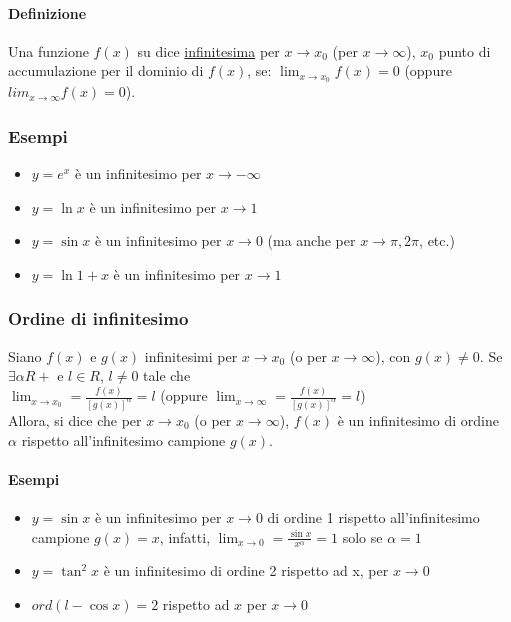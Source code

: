 \documentclass{book}
\begin{document}
\paragraph{Definizione}
Una funzione $f(x)$ su dice \underline{infinitesima} per $x\to x_0$ (per $x\to \infty$), $x_0$ punto di accumulazione per il dominio di $f(x)$, se: $\lim_{x\to x_0}f(x)=0$ (oppure $lim_{x\to \infty}f(x)=0$).
\subsubsection{Esempi}
\begin{itemize}
	\item $y=e^x$ è un infinitesimo per $x\to -\infty$
	\item $y=\ln{x}$ è un infinitesimo per $x\to 1$
	\item $y=\sin{x}$ è un infinitesimo per $x\to 0$ (ma anche per $x\to \pi,2\pi$, etc.)
	\item $y=\ln{1+x}$ è un infinitesimo per $x\to 1$ 
\end{itemize}
\subsubsection{Ordine di infinitesimo}
Siano $f(x)$ e $g(x)$ infinitesimi per $x\to{x_0}$ (o per $x\to \infty$), con $g(x)\neq 0$. Se $\exists\alpha R+$ e $l\in R$, $l\neq 0$ tale che\\
$\lim_{x\to{x_0}}=\frac{f(x)}{[g(x)]^\alpha}=l$ (oppure $\lim_{x\to{\infty}}=\frac{f(x)}{[g(x)]^\alpha}=l$)\\
Allora, si dice che per $x\to x_0$ (o per $x\to \infty$), $f(x)$ è un infinitesimo di ordine $\alpha$ rispetto all'infinitesimo campione $g(x)$.
\paragraph{Esempi}
\begin{itemize}
	\item $y=\sin{x}$ è un infinitesimo per $x\to 0$ di ordine 1 rispetto all'infinitesimo campione $g(x)=x$, infatti, $\lim_{x\to 0}=\frac{\sin{x}}{x^\alpha}=1$ solo se $\alpha = 1$
	\item $y=\tan^2x$ è un infinitesimo di ordine 2 rispetto ad x, per $x\to 0$
	\item $ord(l-\cos{x})=2$ rispetto ad $x$ per $x\to 0$
\end{itemize}
\end{document}
